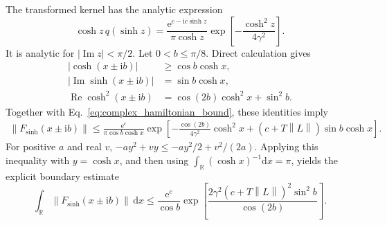\documentclass[aps,pra,reprint,floatfix,unsortedaddress,superscriptaddress]{revtex4-2}
\newcommand{\norm}[1]{\left\lVert#1\right\rVert}
\newcommand{\abs}[1]{\left\lvert#1\right\rvert}
\begin{document}
The transformed kernel has the analytic expression
\begin{equation}
    \cosh z\,q(\sinh z)
    =
    \frac{\mathrm e^{c-\mathrm i c\sinh z}}{\pi\cosh z}
    \exp\!\left[-\frac{\cosh^2z}{4\gamma^2}\right].
    \label{eq:sinh_kernel_analytic}
\end{equation}
It is analytic for $\abs{\operatorname{Im}z}<\pi/2$.  Let
$0<b\leq\pi/8$.  Direct calculation gives
\begin{equation}
\begin{split}
    \abs{\cosh(x\mathbin{\pm}\mathrm ib)}
    &\geq \cos b\cosh x,\\
    \abs{\operatorname{Im}\sinh(x\mathbin{\pm}\mathrm ib)}
    &=\sin b\cosh x,\\
    \operatorname{Re}\cosh^2(x\mathbin{\pm}\mathrm ib)
    &=\cos(2b)\cosh^2x+\sin^2b.
\end{split}
\label{eq:sinh_gaussian_strip}
\end{equation}
Together with Eq.~\eqref{eq:complex_hamiltonian_bound}, these identities
imply
\begin{align}
\norm{F_{\sinh}(x\mathbin{\pm}\mathrm ib)}
\leq
\frac{\mathrm e^c}{\pi\cos b\cosh x}
\exp\!\left[
-\frac{\cos(2b)}{4\gamma^2}\cosh^2x
+(c+T\norm{L})\sin b\cosh x
\right].
\label{eq:sinh_boundary_pointwise}
\end{align}
For positive $a$ and real $v$,
$-ay^2+vy\leq-ay^2/2+v^2/(2a)$.  Applying this inequality with
$y=\cosh x$, and then using
$\int_{\mathbb R}(\cosh x)^{-1}\mathrm dx=\pi$, yields the explicit
boundary estimate
\begin{equation}
\int_{\mathbb R}
\norm{F_{\sinh}(x\mathbin{\pm}\mathrm ib)}\,\mathrm dx
\leq
\frac{\mathrm e^c}{\cos b}
\exp\!\left[
\frac{2\gamma^2(c+T\norm{L})^2\sin^2b}{\cos(2b)}
\right].
\label{eq:sinh_boundary_growth}
\end{equation}
\end{document}

